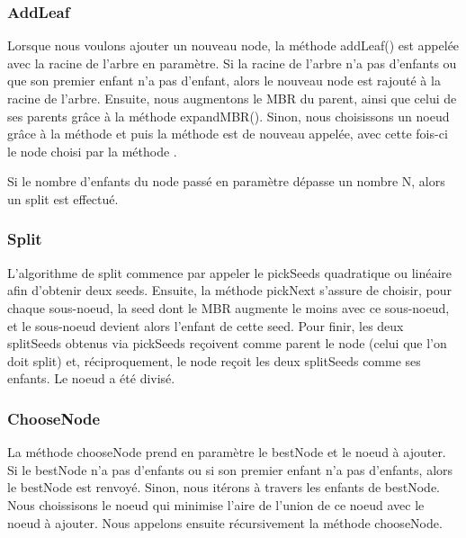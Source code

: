 \documentclass[utf8]{article}
\begin{document}
\begin{large}
  \subsubsection{AddLeaf}\label{addLeaf}
  \indent
  \par
  Lorsque nous voulons ajouter un nouveau node, la méthode addLeaf() est appelée
  avec la racine de l'arbre en paramètre. Si la racine de l'arbre n'a pas
  d'enfants ou que son premier enfant n'a pas d'enfant, alors le nouveau node
  est rajouté à la racine de l'arbre. Ensuite, nous augmentons le MBR du parent,
  ainsi que celui de ses parents grâce à la méthode expandMBR(). Sinon, nous
  choisissons un noeud grâce à la méthode  et puis la méthode 
  est de nouveau appelée, avec cette fois-ci le node choisi par la méthode
  .
  \par
  \indent
  Si le nombre d'enfants du node passé en paramètre dépasse un nombre N, alors
  un split est effectué.
  \par
  \subsubsection{Split}\label{split}
  \indent
  \par
  L'algorithme de split commence par appeler le pickSeeds quadratique ou
  linéaire afin d'obtenir deux seeds. \newline Ensuite, la
  méthode pickNext s'assure de choisir, pour chaque sous-noeud, la seed dont le
  MBR augmente le moins avec ce sous-noeud, et le sous-noeud devient alors
  l'enfant de cette seed. \newline Pour finir, les deux splitSeeds obtenus via
  pickSeeds reçoivent comme parent le node (celui que l'on doit split) et,
  réciproquement, le node reçoit les deux splitSeeds comme ses enfants. Le noeud
  a été divisé.
  \par

  \subsubsection{ChooseNode}\label{chooseNode}
  \indent
  \par
  La méthode chooseNode prend en paramètre le bestNode et le noeud à ajouter.
  Si le bestNode n'a pas d'enfants ou si son premier enfant n'a pas d'enfants,
  alors le bestNode est renvoyé. Sinon, nous itérons à travers les enfants de
  bestNode. Nous choissisons le noeud qui minimise l'aire de l'union de ce noeud avec le noeud à ajouter. Nous appelons ensuite récursivement la méthode chooseNode.


\end{large}
\end{document}
